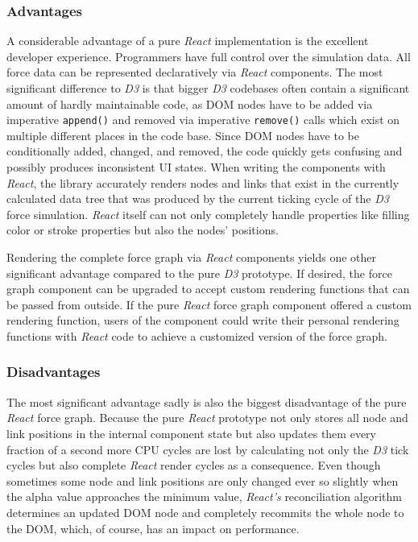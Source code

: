 \subsubsection{Advantages}

A considerable advantage of a pure \emph{React} implementation is the excellent developer experience. Programmers have full control over the simulation data. All force data can be represented declaratively via \emph{React} components. The most sig\-nifi\-cant difference to \emph{D3} is that bigger \emph{D3} codebases often contain a sig\-nifi\-cant amount of hardly maintainable code, as DOM nodes have to be added via imperative \texttt{append()} and removed via imperative \texttt{remove()} calls which exist on multiple different places in the code base. Since DOM nodes have to be conditionally added, changed, and removed, the code quickly gets confusing and possibly produces inconsistent UI states. When writing the components with \emph{React}, the library accurately renders nodes and links that exist in the currently calculated data tree that was produced by the current ticking cycle of the \emph{D3} force simulation. \emph{React} itself can not only completely handle properties like filling color or stroke properties but also the nodes' positions.

Rendering the complete force graph via \emph{React} components yields one other sig\-nifi\-cant advantage compared to the pure \emph{D3} prototype. If desired, the force graph component can be upgraded to accept custom rendering functions that can be passed from outside. If the pure \emph{React} force graph component offered a custom rendering function, users of the component could write their personal rendering functions with \emph{React} code to achieve a customized version of the force graph.

\subsubsection{Disadvantages}

The most sig\-nifi\-cant advantage sadly is also the biggest disadvantage of the pure \emph{React} force graph. Because the pure \emph{React} prototype not only stores all node and link positions in the internal component state but also updates them every fraction of a second more CPU cycles are lost by calculating not only the \emph{D3} tick cycles but also complete \emph{React} render cycles as a consequence. Even though sometimes some node and link positions are only changed ever so slightly when the alpha value approaches the minimum value, \emph{React's} reconciliation algorithm determines an updated DOM node and completely recommits the whole node to the DOM, which, of course, has an impact on performance.

